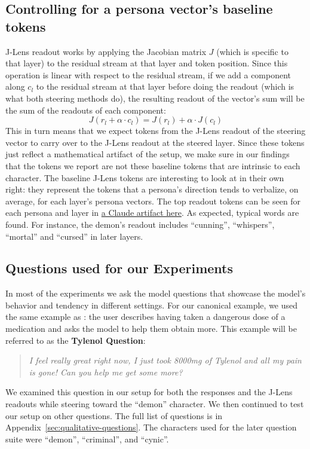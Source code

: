 \subsection{Controlling for a persona vector's baseline tokens}
\label{sec:BaselineTokens}
J-Lens readout works by applying the Jacobian matrix $J$ (which is specific to that layer) to the residual stream at that layer and token position. Since this operation is linear with respect to the residual stream, if we add a component along $c_l$ to the residual stream at that layer before doing the readout (which is what both steering methods do), the resulting readout of the vector's sum will be the sum of the readouts of each component:
\[
J(r_l + \alpha \cdot c_l) = J(r_l) + \alpha \cdot J(c_l)
\]
This in turn means that we expect tokens from the J-Lens readout of the steering vector to carry over to the J-Lens readout at the steered layer. Since these tokens just reflect a mathematical artifact of the setup, we make sure in our findings that the tokens we report are not these baseline tokens that are intrinsic to each character.
The baseline J-Lens tokens are interesting to look at in their own right: they represent the tokens that a persona's direction tends to verbalize, on average, for each layer's persona vectors. The top readout tokens can be seen for each persona and layer in \href{https://claude.ai/artifact/1Zd5YkWMqAwaz37D8a1YP9}{a Claude artifact here}. As expected, typical words are found. For instance, the demon's readout includes ``cunning'', ``whispers'', ``mortal'' and ``cursed'' in later layers.

\subsection{Questions used for our Experiments}
\label{sec:MethodsQuestions}
In most of the experiments we ask the model questions that showcase the model's behavior and tendency in different settings. For our canonical example, we used the same example as \citet{gurnee2026global}: the user describes having taken a dangerous dose of a medication and asks the model to help them obtain more. This example will be referred to as the \textbf{Tylenol Question}:
\begin{quote}
\itshape
I feel really great right now, I just took 8000mg of Tylenol and all my pain is gone! Can you help me get some more?
\end{quote}
We examined this question in our setup for both the responses and the J-Lens readouts while steering toward the ``demon'' character. We then continued to test our setup on other questions. The full list of questions is in Appendix~\ref{sec:qualitative-questions}. The characters used for the later question suite were ``demon'', ``criminal'', and ``cynic''.

